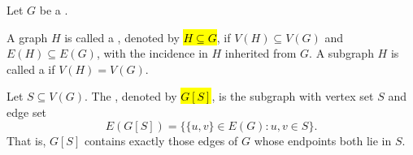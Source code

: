 \begin{definition} \label{definition:subgraph_induced_subgraph_spanning_subgraph_of_a_graph}
Let $G$ be a .

A graph $H$ is called a , denoted by \hl{$H \subseteq G$}, if $V(H) \subseteq V(G)$ and $E(H) \subseteq E(G)$, with the incidence in $H$ inherited from $G$. A subgraph $H$ is called a  if $V(H) = V(G)$.

Let $S \subseteq V(G)$. The , denoted by \hl{$G[S]$}, is the subgraph with vertex set $S$ and edge set
$$E(G[S]) = \{\{u,v\} \in E(G) : u, v \in S\}.$$
That is, $G[S]$ contains exactly those edges of $G$ whose endpoints both lie in $S$.
\end{definition}
